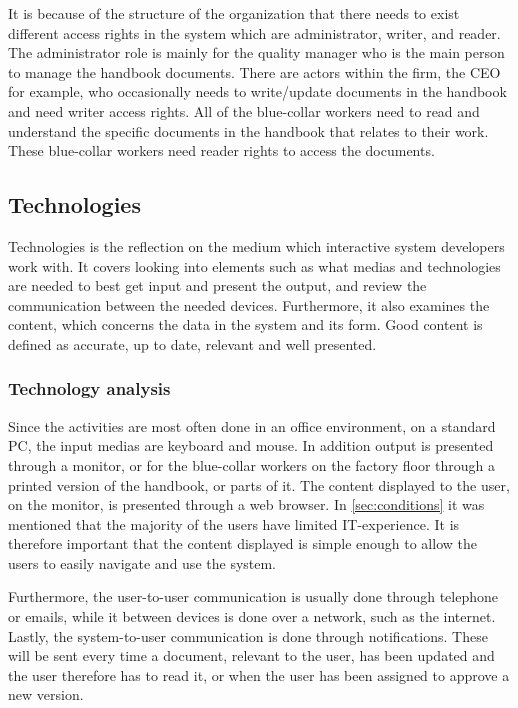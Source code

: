 It is because of the structure of the organization that there needs to exist different access rights in the system which are administrator, writer, and reader.
The administrator role is mainly for the quality manager who is the main person to manage the handbook documents.
There are actors within the firm, the CEO for example, who occasionally needs to write/update documents in the handbook and need writer access rights.
All of the blue-collar workers need to read and understand the specific documents in the handbook that relates to their work.
These blue-collar workers need reader rights to access the documents.

\subsection{Technologies}
Technologies is the reflection on the medium which interactive system developers work with.
It covers looking into elements such as what medias and technologies are needed to best get input and present the output, and review the communication between the needed devices.
Furthermore, it also examines the content, which concerns the data in the system and its form.
Good content is defined as accurate, up to date, relevant and well presented.

\subsubsection*{Technology analysis}
Since the activities are most often done in an office environment, on a standard PC, the input medias are keyboard and mouse.
In addition output is presented through a monitor, or for the blue-collar workers on the factory floor through a printed version of the handbook, or parts of it.
The content displayed to the user, on the monitor, is presented through a web browser.
In \cref{sec:conditions} it was mentioned that the majority of the users have limited IT-experience.
It is therefore important that the content displayed is simple enough to allow the users to easily navigate and use the system.

Furthermore, the user-to-user communication is usually done through telephone or emails, while it between devices is done over a network, such as the internet.
Lastly, the system-to-user communication is done through notifications.
These will be sent every time a document, relevant to the user, has been updated and the user therefore has to read it, or when the user has been assigned to approve a new version.

